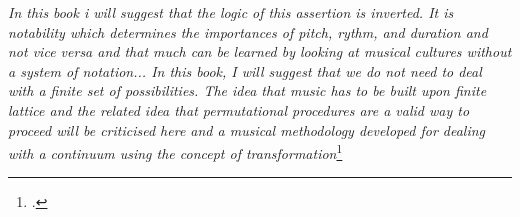 \begin{center}
    \vspace{0.5cm}
    \textit{In this book i will suggest that the logic of this assertion is inverted.
    It is notability which determines the importances of pitch, rythm, and duration and
    not vice versa and that much can be learned by looking at 
    musical cultures without a system of notation... 
    In this book, I will suggest that we do not need to deal with a finite set of
    possibilities. The idea that music has to be built upon  finite lattice and the
    related idea that permutational procedures are a valid way to proceed will
    be criticised here and a musical methodology developed for dealing with a
    continuum using the concept of transformation}\footcite{wishart_on_sonic_art}
\vspace{0.5cm}
\end{center}

